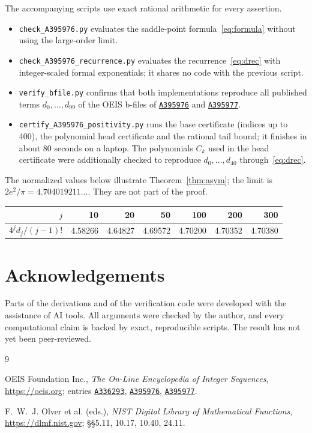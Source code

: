 \documentclass[11pt,a4paper]{article}
\theoremstyle{remark}
\newcommand{\oeis}[1]{\href{https://oeis.org/#1}{\texttt{#1}}}
\begin{document}
The accompanying scripts use exact rational arithmetic for every assertion.
\begin{itemize}
  \item \texttt{check\_A395976.py} evaluates the saddle-point formula~\eqref{eq:formula} without using the large-order limit.
  \item \texttt{check\_A395976\_recurrence.py} evaluates the recurrence~\eqref{eq:drec} with integer-scaled formal exponentials; it shares no code with the previous script.
  \item \texttt{verify\_bfile.py} confirms that both implementations reproduce all published terms $d_0,\dots,d_{99}$ of the OEIS b-files of \oeis{A395976} and \oeis{A395977}.
  \item \texttt{certify\_A395976\_positivity.py} runs the base certificate (indices up to 400), the polynomial head certificate and the rational tail bound; it finishes in about 80 seconds on a laptop. The polynomials $C_k$ used in the head certificate were additionally checked to reproduce $d_0,\dots,d_{40}$ through~\eqref{eq:drec}.
\end{itemize}
The normalized values below illustrate Theorem~\ref{thm:asym}; the limit is $2e^2/\pi=4.704019211\ldots$. They are not part of the proof.

\begin{center}
\begin{tabular}{rrrrrrr}
\toprule
$j$ & 10 & 20 & 50 & 100 & 200 & 300\\
\midrule
$4^jd_j/(j-1)!$ & 4.58266 & 4.64827 & 4.69572 & 4.70200 & 4.70352 & 4.70380\\
\bottomrule
\end{tabular}
\end{center}

\section*{Acknowledgements}
Parts of the derivations and of the verification code were developed with the assistance of AI tools. All arguments were checked by the author, and every computational claim is backed by exact, reproducible scripts. The result has not yet been peer-reviewed.

\begin{thebibliography}{9}

OEIS Foundation Inc., \emph{The On-Line Encyclopedia of Integer Sequences}, \url{https://oeis.org}; entries \oeis{A336293}, \oeis{A395976}, \oeis{A395977}.

F.~W.~J. Olver et al. (eds.), \emph{NIST Digital Library of Mathematical Functions}, \url{https://dlmf.nist.gov}; \S\S5.11, 10.17, 10.40, 24.11.

\end{thebibliography}
\end{document}

